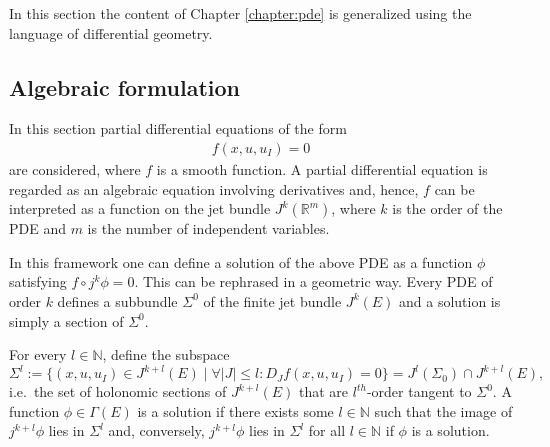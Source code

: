     In this section the content of Chapter \ref{chapter:pde} is generalized using the language of differential geometry.

\subsection{Algebraic formulation}

    In this section partial differential equations of the form
    \begin{gather}
        \label{var:pde_jet}
        f(x,u,u_I) = 0
    \end{gather}
    are considered, where $f$ is a smooth function. A partial differential equation is regarded as an algebraic equation involving derivatives and, hence, $f$ can be interpreted as a function on the jet bundle $J^k(\mathbb{R}^m)$, where $k$ is the order of the PDE and $m$ is the number of independent variables.

    In this framework one can define a solution of the above PDE as a function $\phi$ satisfying $f\circ j^k\phi=0$. This can be rephrased in a geometric way. Every PDE of order $k$ defines a subbundle $\Sigma^0$ of the finite jet bundle $J^k(E)$ and a solution is simply a section of $\Sigma^0$.

    \begin{remark}
        For every $l\in\mathbb{N}$, define the subspace \[\Sigma^l:=\{(x,u,u_I)\in J^{k+l}(E)\mid\forall|J|\leq l:D_Jf(x,u,u_I)= 0\} = J^l(\Sigma_0)\cap J^{k+l}(E),\] i.e.~the set of holonomic sections of $J^{k+l}(E)$ that are $l^{th}$-order tangent to $\Sigma^0$. A function $\phi\in\Gamma(E)$ is a solution if there exists some $l\in\mathbb{N}$ such that the image of $j^{k+l}\phi$ lies in $\Sigma^l$ and, conversely, $j^{k+l}\phi$ lies in $\Sigma^l$ for all $l\in\mathbb{N}$ if $\phi$ is a solution.
    \end{remark}

